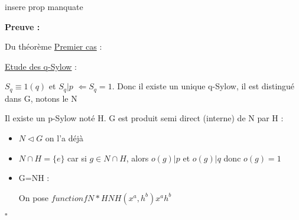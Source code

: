 \documentclass{report}
\renewenvironment{leftbar}{%
  \def\FrameCommand{\vrule width 0.4pt \hspace{10pt}}%
  \MakeFramed {\advance\hsize-\width \FrameRestore}}%
 {\endMakeFramed}%
\newenvironment{preuve}{\vspace*{0.5cm}
    \begin{leftbar}
    \noindent\textbf{Preuve :}\par}{
    \begin{flushright}
    $\square$
    \end{flushright}
    \end{leftbar}
}
\begin{document}
insere prop manquate

\begin{preuve} Du théorème
\underline{Premier cas} :\par
\underline{Etude des q-Sylow} :

$S_{q}\equiv 1(q)$ et  $S_{q} | p$ $\Longleftarrow S_{q} = 1$. Donc il existe un unique q-Sylow, il est distingué dans G, notons le N


Il existe un p-Sylow noté H. G est produit semi direct (interne) de N par H :
\begin{itemize}
\item $N\triangleleft G$ on l'a déjà
\item $N\cap H = \{e\}$ car si $g \in N\cap H$, alors $o(g)|p$ et $o(g)|q$ donc $o(g)=1$
\item G=NH :\par 
On pose $function{f}{N* H}{NH}{(x^{a},h^{b})}{x^{a}h^{b}}$
\end{itemize}



\end{preuve}
\end{document}
